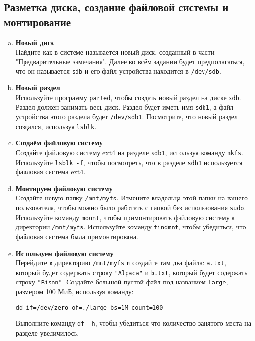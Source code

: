 \documentclass{article}
\begin{document}
\subsection{Разметка диска, создание файловой системы и монтирование}
\begin{enumerate}[a.]
\item \textbf{Новый диск}\\
Найдите как в системе называется новый диск, созданный в части "Предварительные замечания". Далее во всём задании будет предполагаться, что он называется \texttt{sdb} и его файл устройства находится в \texttt{/dev/sdb}.

\item \textbf{Новый раздел}\\
Используйте программу \texttt{parted}, чтобы создать новый раздел на диске \texttt{sdb}. Раздел должен занимать весь диск. Раздел будет иметь имя \texttt{sdb1}, а файл устройства этого раздела будет \texttt{/dev/sdb1}. Посмотрите, что новый раздел создался, используя \texttt{lsblk}.

\item \textbf{Создаём файловую систему}\\
Создайте файловую систему ext4 на разделе \texttt{sdb1}, используя команду \texttt{mkfs}. Используйте \texttt{lsblk -f}, чтобы посмотреть, что в разделе \texttt{sdb1} используется файловая система ext4.

\item \textbf{Монтируем файловую систему}\\
Создайте новую папку \texttt{/mnt/myfs}. Измените владельца этой папки на вашего пользователя, чтобы можно было работать с папкой без использования \texttt{sudo}. Используйте команду \texttt{mount}, чтобы примонтировать файловую систему к директории \texttt{/mnt/myfs}. Используйте команду \texttt{findmnt}, чтобы убедиться, что файловая система была примонтирована.

\item \textbf{Используем файловую систему}\\
Перейдите в директорию \texttt{/mnt/myfs} и создайте там два файла: \texttt{a.txt}, который будет содержать строку \texttt{"Alpaca"} и \texttt{b.txt}, который будет содержать строку \texttt{"Bison"}. Создайте большой пустой файл под названием \texttt{large}, размером 100 МиБ, используя команду:
\begin{lstlisting}
dd if=/dev/zero of=./large bs=1M count=100
\end{lstlisting}
Выполните команду \texttt{df -h}, чтобы убедиться что количество занятого места на разделе увеличилось.


\end{enumerate}
\end{document}
